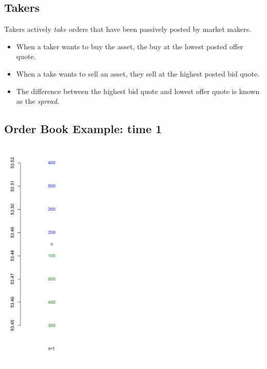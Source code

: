 \documentclass[letterpaper,10pt,english]{sphinxmanual}
\begin{document}
\subsection{Takers}
\label{trading:takers}
Takers actively \emph{take} orders that have been passively posted by
market makers.
\begin{itemize}
\item {} 
When a taker wants to buy the asset, the buy at the lowest posted
offer quote.

\end{itemize}
\begin{itemize}
\item {} 
When a take wants to sell an asset, they sell at the highest posted
bid quote.

\end{itemize}
\begin{itemize}
\item {} 
The difference between the highest bid quote and lowest offer quote
is known as the \emph{spread}.

\end{itemize}


\subsection{Order Book Example: time 1}
\label{trading:order-book-example-time-1}
\includegraphics[width=6in]{orderBook1.png}
\end{document}

